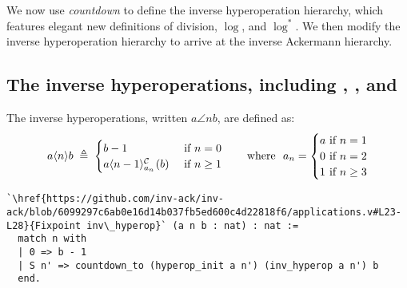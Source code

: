 We now use \emph{countdown} to define the inverse
hyperoperation hierarchy, which features elegant new definitions of
division, $\log$, and $\log^{*}$.
We then modify the inverse hyperoperation hierarchy to arrive at the inverse
Ackermann hierarchy.

\subsection{The inverse hyperoperations, including , , and }

\begin{defn} \label{defn: inv-hyperop}
	The inverse hyperoperations, written $a\angle{n}b$, are defined as:
	\begin{equation}
	a\angle{n}b \; \triangleq \; \begin{cases}
	b - 1 & \hspace{-10pt} \quad \text{ if } n = 0 \\
	\cdt{a\angle{n-1}}{a_n}(b) & \hspace{-10pt} \quad \text{ if } n \ge 1
	\end{cases}
	\ \ \quad \text{ where } \ a_n = \begin{cases}
	a & \hspace{-10pt}\text{ if } n = 1 \\
	0 & \hspace{-10pt}\text{ if } n = 2 \\
	1 & \hspace{-10pt}\text{ if } n \ge 3
	\end{cases}
	\end{equation}
\begin{lstlisting}
`\href{https://github.com/inv-ack/inv-ack/blob/6099297c6ab0e16d14b037fb5ed600c4d22818f6/applications.v#L23-L28}{Fixpoint inv\_hyperop}` (a n b : nat) : nat :=
  match n with
  | 0 => b - 1
  | S n' => countdown_to (hyperop_init a n') (inv_hyperop a n') b
  end.
\end{lstlisting}
\end{defn}
